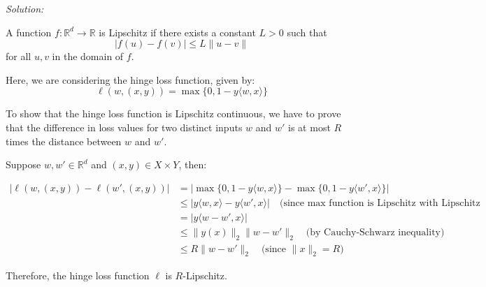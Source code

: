 \documentclass[
	10pt, %
	a4paper, %
	oneside, %
	headinclude,footinclude, %
	BCOR5mm, %
]{scrartcl}
\newenvironment{solution}
{\textit{Solution:}}
{}
\begin{document}
\begin{solution}

	A function $f: \mathbb{R}^d \rightarrow \mathbb{R}$ is Lipschitz if there exists a constant $L > 0$ such that
	\[|f(u) - f(v)| \leq L\|u - v\|\]
	for all $u, v$ in the domain of $f$.

	Here, we are considering the hinge loss function, given by:
	\[\ell(w, (x, y)) = \max\{0, 1 - y\langle w, x \rangle\}\]

	To show that the hinge loss function is Lipschitz continuous, we have to prove that the difference in loss values for two distinct inputs $w$ and $w'$ is at most $R$ times the distance between $w$ and $w'$.

	Suppose $w, w' \in \mathbb{R}^d$ and $(x, y) \in X \times Y$, then:

	\begin{align*}
		| \ell(w, (x, y)) - \ell(w', (x, y)) | & = | \max\{0, 1 - y\langle w, x \rangle\} - \max\{0, 1 - y\langle w', x \rangle\} |                                               \\
		                                       & \leq | y\langle w, x \rangle - y\langle w', x \rangle | \quad \text{(since max function is Lipschitz with Lipschitz constant 1)} \\
		                                       & = | y\langle w - w', x \rangle |                                                                                                 \\
		                                       & \leq \| y(x) \|_2 \| w - w' \|_2 \quad \text{(by Cauchy-Schwarz inequality)}                                                     \\
		                                       & \leq R \| w - w' \|_2 \quad \text{(since $\| x \|_2 = R$)}
	\end{align*}

	Therefore, the hinge loss function $\ell$ is $R$-Lipschitz.
\end{solution}


\end{document}
